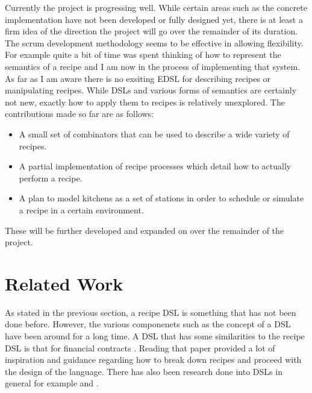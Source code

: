 \documentclass[11pt]{article}
\begin{document}
    Currently the project is progressing well. While certain areas such as the concrete implementation have
    not been developed or fully designed yet, there is at least a firm idea of the direction the project will go
    over the remainder of its duration. The scrum development methodology seems to be effective in allowing
    flexibility. For example quite a bit of time was spent thinking of how to represent the semantics of a
    recipe and I am now in the process of implementing that system. \\
    
    As far as I am aware there is no exsiting EDSL for describing recipes or manipulating recipes. While DSLs
    and various forms of semantics are certainly not new, exactly how to apply them to recipes is relatively
    unexplored. The contributions made so far are as follows:

    \begin{itemize}
        \item A small set of combinators that can be used to describe a wide variety of recipes.

        \item A partial implementation of recipe processes which detail how to actually perform a recipe.

        \item A plan to model kitchens as a set of stations in order to schedule or simulate a recipe
        in a certain environment.
    \end{itemize}

    These will be further developed and expanded on over the remainder of the project.

    \section{Related Work}

    As stated in the previous section, a recipe DSL is something that has not been done before.
    However, the various componenets such as the concept of a DSL have been around for a long time.
    A DSL that has some similarities to the recipe DSL is that for financial contracts \cite{contracts}.
    Reading that paper provided a lot of inspiration and guidance regarding how to break down recipes
    and proceed with the design of the language. There has also been research done into DSLs
    in general for example \cite{hudak} and \cite{snoyman}.
\end{document}
